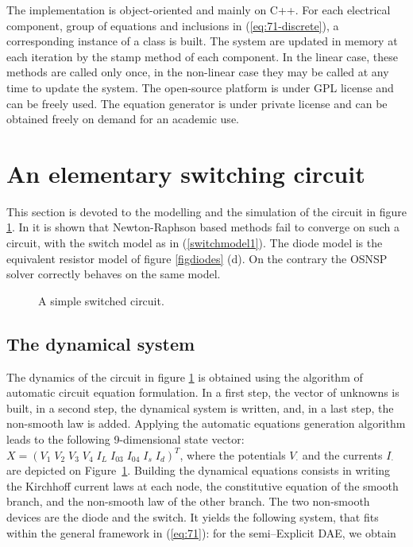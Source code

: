 The implementation is object-oriented and mainly on C++. For each electrical component, group of equations and inclusions in (\ref{eq:71-discrete}), a corresponding instance of a class is built. The system are updated in memory at each iteration by the stamp method of each component. In the linear case, these methods are called only once, in the non-linear case they may be called at any time to update the system. The open-source platform is under GPL license and can be freely used. The equation generator is under private license and can be obtained freely on demand for an academic use.  


\section{An elementary switching circuit}
\label{section3}


This section is devoted to the  modelling and the simulation of the circuit in figure \ref{fig:figcircuit1}. In \cite{maffezzoni2006} it is shown that Newton-Raphson based methods fail to converge on such a circuit, with the switch model as in (\ref{switchmodel1}). The diode model is the equivalent resistor model of figure \ref{figdiodes} (d). On the contrary the OSNSP solver correctly behaves on the same model.  

\begin{figure}[h]
  \centering
   \resizebox{\linewidth}{!}{
  
  }
  \caption{A simple switched circuit.}
  \label{fig:figcircuit1}
\end{figure}
\subsection{The dynamical system}
\label{section31}

The dynamics of the circuit in figure \ref{fig:figcircuit1} is obtained using the algorithm of automatic circuit equation formulation.
In a first step, the vector of unknowns is built, in a second step, the dynamical system is
written, and, in a last step, the non-smooth law is added. Applying the automatic equations generation algorithm leads to the following 9-dimensional state vector: $X=(V_1\;V_2\;V_3\;V_4\;I_L\;I_{03}\;I_{04}\;I_s\;I_d)^{T}$, where the potentials $V_{\cdot}$ and the currents $I_{\cdot}$ are depicted on Figure~\ref{fig:figcircuit1}.  Building the dynamical equations consists in writing the Kirchhoff current laws at each node, the constitutive equation of the smooth branch, and the
non-smooth law of the other branch. The two non-smooth devices are the diode and the switch. It yields the following system, that fits within the general framework in (\ref{eq:71}): for the semi--Explicit DAE, we obtain

